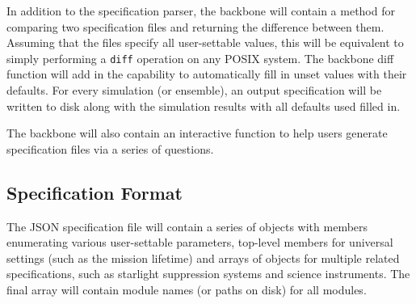 \documentclass[cleanfoot]{asme2ej}
\begin{document}
In addition to the specification parser, the backbone will contain a method for comparing two specification files and returning the difference between them.  Assuming that the files specify all user-settable values, this will be equivalent to simply performing a \verb+diff+ operation on any POSIX system.  The backbone diff function will add in the capability to automatically fill in unset values with their defaults.  For every simulation (or ensemble), an output specification will be written to disk along with the simulation results with all defaults used filled in.

The backbone will also contain an interactive function to help users generate specification files via a series of questions.

\subsection{Specification Format}\label{sec:inputspec}
The JSON specification file will contain a series of objects with members enumerating various user-settable parameters, top-level members for universal settings (such as the mission lifetime) and arrays of objects for multiple related specifications, such as starlight suppression systems and science instruments.  The final array will contain module names (or paths on disk) for all modules.
\end{document}
